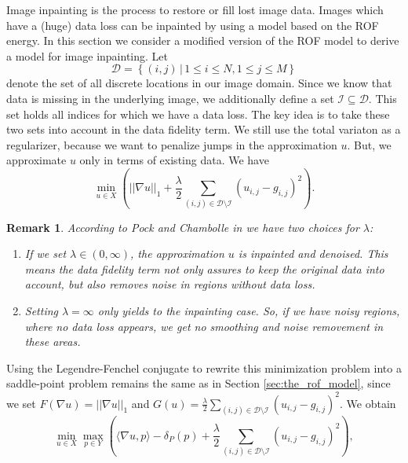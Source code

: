 \documentclass[abstracton]{scrreprt}
\newtheorem{remark}[theorem]{Remark}
\begin{document}
        Image inpainting is the process to restore or fill lost image data. Images which have a (huge) data loss can be inpainted by using a model based on the ROF energy. In this section we consider a modified version of the ROF model to derive a model for image inpainting. Let
            $$
                \mathcal{D} = \left\{ (i, j) \, | \, 1 \le i \le N, 1 \le j \le M \right\}
            $$
        denote the set of all discrete locations in our image domain. Since we know that data is missing in the underlying image, we additionally define a set $\mathcal{I} \subseteq \mathcal{D}$. This set holds all indices for which we have a data loss. The key idea is to take these two sets into account in the data fidelity term. We still use the total variaton as a regularizer, because we want to penalize jumps in the approximation $u$. But, we approximate $u$ only in terms of existing data. We have
            \begin{equation}
                \min_{u \in X} \left( ||\nabla u||_{1} + \frac{\lambda}{2} \sum_{(i,j) \in \mathcal{D} \setminus \mathcal{I}} (u_{i,j} - g_{i,j})^{2} \right).
                \label{eq:inpainting_model}
            \end{equation}
        \begin{remark}
            According to Pock and Chambolle in \cite{Chambolle10afirst-order} we have two choices for $\lambda$:
                \begin{enumerate}
                    \item If we set $\lambda \in (0, \infty)$, the approximation $u$ is inpainted and denoised. This means the data fidelity term not only assures to keep the original data into account, but also removes noise in regions without data loss.
                    \item Setting $\lambda = \infty$ only yields to the inpainting case. So, if we have noisy regions, where no data loss appears, we get no smoothing and noise removement in these areas.
                \end{enumerate}
        \end{remark}
        Using the Legendre-Fenchel conjugate to rewrite this minimization problem into a saddle-point problem remains the same as in Section \ref{sec:the_rof_model}, since we set $F(\nabla u) = ||\nabla u||_{1}$ and $G(u) = \frac{\lambda}{2} \sum_{(i,j) \in \mathcal{D} \setminus \mathcal{I}} (u_{i,j} - g_{i,j})^{2}$. We obtain
            \begin{equation}
                \min_{u \in X} \max_{p \in Y} \left( \langle \nabla u, p \rangle  - \delta_{P}(p) + \frac{\lambda}{2} \sum_{(i,j) \in \mathcal{D} \setminus \mathcal{I}} (u_{i,j} - g_{i,j})^{2} \right),
                \label{eq:inpainting_primal_dual}
            \end{equation}
\end{document}
